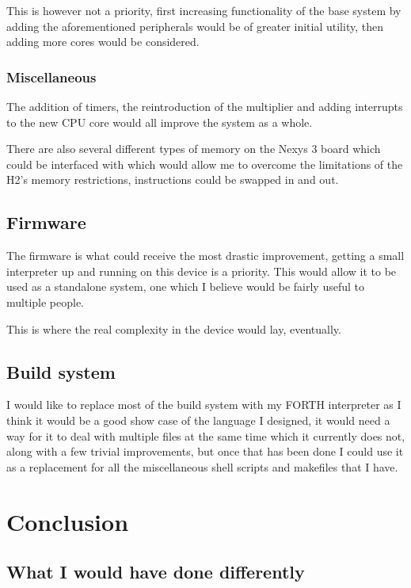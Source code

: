 \documentclass	[a4paper, 10pt]	{article}
\begin{document}
      This is however not a priority, first increasing functionality of the base
      system by adding the aforementioned peripherals would be of greater initial
      utility, then adding more cores would be considered.

      \subsubsection{Miscellaneous}
      
      The addition of timers, the reintroduction of the multiplier and adding 
      interrupts to the new CPU core would all improve the system as a whole.

      There are also several different types of memory on the Nexys 3 board
      which could be interfaced with which would allow me to overcome the
      limitations of the H2's memory restrictions, instructions could be swapped
      in and out.

    \subsection{Firmware}

    The firmware is what could receive the most drastic improvement, getting a small
    interpreter up and running on this device is a priority. This would allow it
    to be used as a standalone system, one which I believe would be fairly useful
    to multiple people. 

    This is where the real complexity in the device would lay, eventually.

    \subsection{Build system}

    I would like to replace most of the build system with my FORTH interpreter as I
    think it would be a good show case of the language I designed, it would need
    a way for it to deal with multiple files at the same time which it currently does
    not, along with a few trivial improvements, but once that has been done I could
    use it as a replacement for all the miscellaneous shell scripts and makefiles
    that I have.

  \section{Conclusion}
    \subsection{What I would have done differently}
\end{document}
